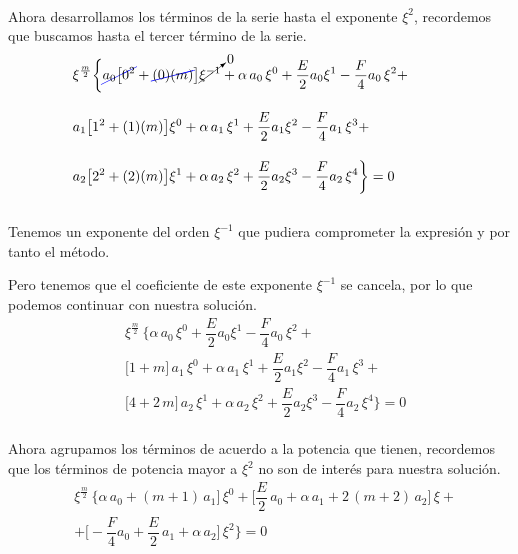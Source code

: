 \\
Ahora desarrollamos los términos de la serie hasta el exponente  $\xi^{2}$, recordemos que buscamos hasta el tercer término de la serie.
\begin{align*}
&{} \xi^{\frac{m}{2}} \bigg\{ \Cancel[blue]{a_{0} \big[ 0^{2}} + \Cancel[blue]{(0)(m)} \big] \cancelto{0}{\xi^{-1}} + \alpha \, a_{0} \, \xi^{0} + \dfrac{E}{2} a_{0} \xi^{1} - \dfrac{F}{4} a_{0} \, \xi^{2} + \hspace{1cm} \\[1em]
&{} a_{1} \big[ 1^{2} + (1)(m) \big] \xi^{0} + \alpha \, a_{1} \, \xi^{1} + \dfrac{E}{2} a_{1} \xi^{2} - \dfrac{F}{4} a_{1} \, \xi^{3} + \\[1em]
&{} a_{2} \big[ 2^{2} + (2)(m) \big] \xi^{1} + \alpha \, a_{2} \, \xi^{2} + \dfrac{E}{2} a_{2} \xi^{3} - \dfrac{F}{4} a_{2} \, \xi^{4} \bigg\} = 0
\end{align*}
\\
Tenemos un exponente del orden $\xi^{-1}$ que pudiera comprometer la expresión y por tanto el método.
\par
Pero tenemos que el coeficiente de este exponente $\xi^{-1}$ se cancela, por lo que podemos continuar con nuestra solución.
\begin{align*}
&{} \xi^{\frac{m}{2}} \, \bigg\{ \alpha \, a_{0} \, \xi^{0} + \dfrac{E}{2} a_{0} \xi^{1} - \dfrac{F}{4} a_{0} \, \xi^{2} + \hspace{1cm} \\[1em]
&{} \big[ 1 + m \big] \, a_{1} \, \xi^{0} + \alpha \, a_{1} \, \xi^{1} + \dfrac{E}{2} a_{1} \xi^{2} - \dfrac{F}{4} a_{1} \, \xi^{3} + \\[1em]
&{} \big[ 4 + 2 \, m \big] \, a_{2} \, \xi^{1} + \alpha \, a_{2} \, \xi^{2} + \dfrac{E}{2} a_{2} \xi^{3} - \dfrac{F}{4} a_{2} \, \xi^{4} \bigg\} = 0
\end{align*}
\\
Ahora agrupamos los términos de acuerdo a la potencia que tienen, recordemos que los términos de potencia mayor a $\xi^{2}$ no son de interés para nuestra solución.
\begin{align*}
&{} \xi^{\frac{m}{2}} \, \bigg\{ \alpha \, a_{0} + (m + 1) \, a_{1} \bigg]  \, \xi^{0} + \bigg[ \dfrac{E}{2} \, a_{0} + \alpha \, a_{1} + 2 \, (m + 2) \, a_{2} \bigg] \,  \xi + \\[1em]
&+ \bigg[ - \dfrac{F}{4} a_{0} + \dfrac{E}{2} \, a_{1} + \alpha \, a_{2} \bigg] \, \xi^{2} \bigg\}= 0
\end{align*}

